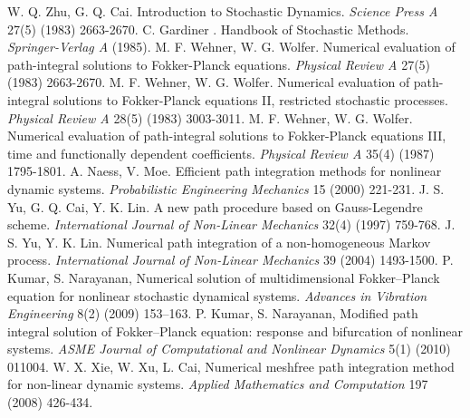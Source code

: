 \documentclass[a4paper, 11pt, final]{article}
\begin{document}
\begin{thebibliography}{aaa}
    W. Q. Zhu, G. Q. Cai. Introduction to Stochastic Dynamics.
    \textsl{Science Press A} 27(5) (1983) 2663-2670.
    C. Gardiner . Handbook of Stochastic Methods. 
    \textsl{Springer-Verlag A} (1985).
    M. F. Wehner, W. G. Wolfer. Numerical evaluation of path-integral solutions to Fokker-Planck equations. 
    \textsl{Physical Review A} 27(5) (1983) 2663-2670.
    M. F. Wehner, W. G. Wolfer. Numerical evaluation of path-integral solutions to Fokker-Planck equations II, restricted stochastic processes. 
    \textsl{Physical Review A} 28(5) (1983) 3003-3011.
    M. F. Wehner, W. G. Wolfer. Numerical evaluation of path-integral solutions to Fokker-Planck equations III, time and functionally dependent coefficients. 
    \textsl{Physical Review A} 35(4) (1987) 1795-1801.
    A. Naess, V. Moe. Efficient path integration methods for nonlinear dynamic systems. 
    \textsl{Probabilistic Engineering Mechanics} 15 (2000) 221-231.
    J. S. Yu, G. Q. Cai, Y. K. Lin. A new path procedure based on Gauss-Legendre scheme. 
    \textsl{International Journal of Non-Linear Mechanics} 32(4) (1997) 759-768.
     J. S. Yu, Y. K. Lin. Numerical path integration of a non-homogeneous Markov process. 
    \textsl{International Journal of Non-Linear Mechanics} 39 (2004) 1493-1500.
     P. Kumar, S. Narayanan, Numerical solution of multidimensional Fokker–Planck equation for nonlinear stochastic dynamical systems.
    \textsl{Advances in Vibration Engineering} 8(2) (2009) 153–163.
     P. Kumar, S. Narayanan, Modified path integral solution of Fokker–Planck equation: response and bifurcation of nonlinear systems.
    \textsl{ASME Journal of Computational and Nonlinear Dynamics} 5(1) (2010) 011004.
     W. X. Xie, W. Xu, L. Cai, Numerical meshfree path integration method for non-linear dynamic systems.
    \textsl{Applied Mathematics and Computation} 197 (2008) 426-434.
    

\end{thebibliography}
\end{document}
